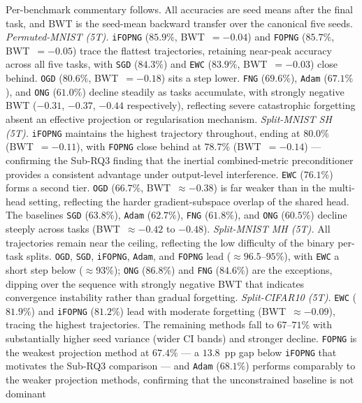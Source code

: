Per-benchmark commentary follows. All accuracies are seed means after the final
task, and BWT is the seed-mean backward transfer over the canonical five seeds.
%
\emph{Permuted-MNIST (5T).}
\texttt{iFOPNG} ($85.9\%$, BWT~$=-0.04$) and \texttt{FOPNG} ($85.7\%$,
BWT~$=-0.05$) trace the flattest trajectories, retaining near-peak accuracy
across all five tasks, with \texttt{SGD} ($84.3\%$) and \texttt{EWC} ($83.9\%$,
BWT~$=-0.03$) close behind. \texttt{OGD} ($80.6\%$, BWT~$=-0.18$) sits a step
lower. \texttt{FNG} ($69.6\%$), \texttt{Adam} ($67.1\%$), and \texttt{ONG}
($61.0\%$) decline steadily as tasks accumulate, with strongly negative BWT
($-0.31$, $-0.37$, $-0.44$ respectively), reflecting severe catastrophic
forgetting absent an effective projection or regularisation mechanism.
%
\emph{Split-MNIST SH (5T).}
\texttt{iFOPNG} maintains the highest trajectory throughout, ending at $80.0\%$
(BWT~$=-0.11$), with \texttt{FOPNG} close behind at $78.7\%$ (BWT~$=-0.14$) ---
confirming the Sub-RQ3 finding that the inertial combined-metric preconditioner
provides a consistent advantage under output-level interference. \texttt{EWC}
($76.1\%$) forms a second tier. \texttt{OGD} ($66.7\%$, BWT~$\approx-0.38$) is
far weaker than in the multi-head setting, reflecting the harder
gradient-subspace overlap of the shared head. The baselines \texttt{SGD}
($63.8\%$), \texttt{Adam} ($62.7\%$), \texttt{FNG} ($61.8\%$), and \texttt{ONG}
($60.5\%$) decline steeply across tasks (BWT~$\approx-0.42$ to $-0.48$).
%
\emph{Split-MNIST MH (5T).}
All trajectories remain near the ceiling, reflecting the low difficulty of the
binary per-task splits. \texttt{OGD}, \texttt{SGD}, \texttt{iFOPNG},
\texttt{Adam}, and \texttt{FOPNG} lead ($\approx 96.5$--$95\%$), with
\texttt{EWC} a short step below ($\approx 93\%$); \texttt{ONG} ($86.8\%$) and
\texttt{FNG} ($84.6\%$) are the exceptions, dipping over the sequence with
strongly negative BWT that indicates convergence instability rather than
gradual forgetting.
%
\emph{Split-CIFAR10 (5T).}
\texttt{EWC} ($81.9\%$) and \texttt{iFOPNG} ($81.2\%$) lead with moderate
forgetting (BWT~$\approx-0.09$), tracing the highest trajectories. The remaining
methods fall to $67$--$71\%$ with substantially higher seed variance (wider CI
bands) and stronger decline. \texttt{FOPNG} is the weakest projection method at
$67.4\%$ --- a $13.8$~pp gap below \texttt{iFOPNG} that motivates the Sub-RQ3
comparison --- and \texttt{Adam} ($68.1\%$) performs comparably to the weaker
projection methods, confirming that the unconstrained baseline is not dominant
